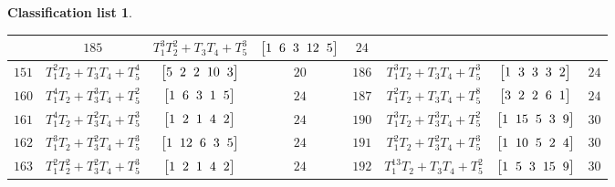 \documentclass[10pt,a4paper]{amsart}
\theoremstyle{definition}
\newtheorem{class-list}[thm]{Classification list}
\numberwithin{equation}{section}
\begin{document}
\begin{class-list}
\begin{table}[t!]
\begin{tabu}{c|c|c|c||c|c|c|c}
&${185}$&${T_{1}^{3}T_{2}^{2}+T_{3}T_{4}+T_{5}^{3}}$
&$\arraycolsep=1mm\begin{bmatrix}{1} & {6} & {3} & {12} & {5}\end{bmatrix}$&${24}$
\\
\hline
${151}$&${T_{1}^{2}T_{2}+T_{3}T_{4}+T_{5}^{4}}$
&$\arraycolsep=1mm\begin{bmatrix}{5} & {2} & {2} & {10} & {3}\end{bmatrix}$&${20}$
&${186}$&${T_{1}^{3}T_{2}+T_{3}T_{4}+T_{5}^{3}}$
&$\arraycolsep=1mm\begin{bmatrix}{1} & {3} & {3} & {3} & {2}\end{bmatrix}$&${24}$
\\
\hline
${160}$&${T_{1}^{4}T_{2}+T_{3}^{3}T_{4}+T_{5}^{2}}$
&$\arraycolsep=1mm\begin{bmatrix}{1} & {6} & {3} & {1} & {5}\end{bmatrix}$&${24}$
&${187}$&${T_{1}^{2}T_{2}+T_{3}T_{4}+T_{5}^{8}}$
&$\arraycolsep=1mm\begin{bmatrix}{3} & {2} & {2} & {6} & {1}\end{bmatrix}$&${24}$
\\
\hline
${161}$&${T_{1}^{4}T_{2}+T_{3}^{2}T_{4}+T_{5}^{3}}$
&$\arraycolsep=1mm\begin{bmatrix}{1} & {2} & {1} & {4} & {2}\end{bmatrix}$&${24}$
&${190}$&${T_{1}^{3}T_{2}+T_{3}^{3}T_{4}+T_{5}^{2}}$
&$\arraycolsep=1mm\begin{bmatrix}{1} & {15} & {5} & {3} & {9}\end{bmatrix}$&${30}$
\\
\hline
${162}$&${T_{1}^{3}T_{2}+T_{3}^{2}T_{4}+T_{5}^{3}}$
&$\arraycolsep=1mm\begin{bmatrix}{1} & {12} & {6} & {3} & {5}\end{bmatrix}$&${24}$
&${191}$&${T_{1}^{2}T_{2}+T_{3}^{2}T_{4}+T_{5}^{3}}$
&$\arraycolsep=1mm\begin{bmatrix}{1} & {10} & {5} & {2} & {4}\end{bmatrix}$&${30}$
\\
\hline
${163}$&${T_{1}^{2}T_{2}^{2}+T_{3}^{2}T_{4}+T_{5}^{3}}$
&$\arraycolsep=1mm\begin{bmatrix}{1} & {2} & {1} & {4} & {2}\end{bmatrix}$&${24}$
&${192}$&${T_{1}^{13}T_{2}+T_{3}T_{4}+T_{5}^{2}}$
&$\arraycolsep=1mm\begin{bmatrix}{1} & {5} & {3} & {15} & {9}\end{bmatrix}$&${30}$
\\
\hline
\end{tabu}\vspace{-4mm}
\end{table}


\end{class-list}
\end{document}

